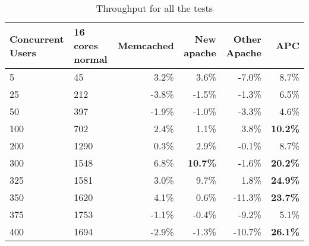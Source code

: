\begin{comment}
\end{comment}

\begin{table}[htb!]\begin{center}
\caption{Throughput for all the tests}  \label{tab:scalingBeginToEndThroughput}
\begin{tabular}{|p{2.1cm}|p{1.7cm}|r|r|r|r|}\hline\rowcolor{myLightGreen}
 {\bf\color{white} Concurrent Users} & {\bf\color{white} 16 cores normal} & {\bf\color{white} Memcached} & {\bf\color{white} New apache} & {\bf\color{white} Other Apache} & {\bf\color{white} APC} \\ \hline 
 5 & 45 & 3.2\% & 3.6\% & -7.0\% & 8.7\% \\ \hline 
 25 & 212 & -3.8\% & -1.5\% & -1.3\% & 6.5\% \\ \hline 
 50 & 397 & -1.9\% & -1.0\% & -3.3\% & 4.6\% \\ \hline 
 100 & 702 & 2.4\% & 1.1\% & 3.8\% &  \textbf{10.2\%} \\ \hline 
 200 & 1290 & 0.3\% & 2.9\% & -0.1\% & 8.7\% \\ \hline 
 300 & 1548 & 6.8\% & \textbf{10.7\%} & -1.6\% &  \textbf{20.2\%} \\ \hline 
 325 & 1581 & 3.0\% & 9.7\% & 1.8\% &  \textbf{24.9\%} \\ \hline 
 350 & 1620 & 4.1\% & 0.6\% & -11.3\% & \textbf{23.7\%} \\ \hline 
 375 & 1753 & -1.1\% & -0.4\% & -9.2\% & 5.1\% \\ \hline 
 400 & 1694 & -2.9\% & -1.3\% & -10.7\% & \textbf{26.1\%} \\ \hline 
\end{tabular}\end{center}
\end{table}


